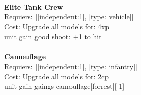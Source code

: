 \ \\
{\bf Elite Tank Crew } \\

Requiers: [[independent:1], [type: vehicle]] \\
Cost: Upgrade all models for: 4xp \\
unit gain good shoot: +1 to hit\\ 









\ \\
{\bf Camouflage } \\

Requiers: [[independent:1], [type: infantry]] \\
Cost: Upgrade all models for: 2cp \\
unit gain gaings camouflage[forrest][-1]\\ 









